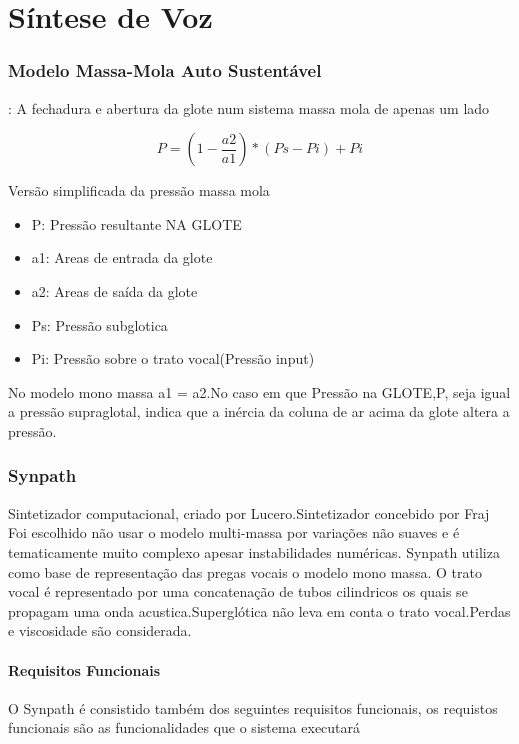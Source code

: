 \chapter{Síntese de Voz}

	\subsection{Modelo Massa-Mola Auto Sustentável}:
	A fechadura e abertura da glote num sistema massa mola de apenas um lado

	\[
		P = (1 - \frac{a2}{a1})*(Ps- Pi) + Pi
	\]
		
	
	Versão simplificada da pressão massa mola
	\begin{itemize}
		\item P: Pressão resultante NA GLOTE
		\item a1: Areas de entrada da glote
		\item a2: Areas de saída  da glote
		\item Ps: Pressão subglotica
		\item Pi: Pressão sobre o trato vocal(Pressão input)
	\end{itemize}
	
		No modelo mono massa a1 = a2.No caso em que Pressão na GLOTE,P, seja  igual a pressão  supraglotal, indica que a inércia da coluna de ar acima da glote altera a pressão.
	
	
	\subsection{Synpath}
		Sintetizador computacional, criado por Lucero.Sintetizador concebido por Fraj \cite{JeanFrancis}
		Foi escolhido não usar o modelo multi-massa por variações não suaves  e é tematicamente muito complexo apesar instabilidades numéricas.
		Synpath utiliza como base de representação das pregas vocais o modelo mono massa. O trato vocal é representado por uma concatenação de tubos cilindricos os quais se propagam uma onda acustica.Superglótica não leva em conta o trato vocal.Perdas e viscosidade são considerada.
	
		\subsubsection{Requisitos Funcionais}
		
		O Synpath é consistido também dos seguintes requisitos funcionais, os requistos funcionais são as funcionalidades que o sistema executará\cite{SWEBOK}
		
